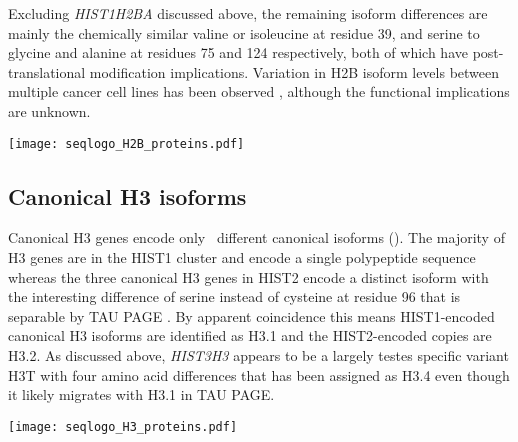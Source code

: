     Excluding \textit{HIST1H2BA} discussed above,
    the remaining isoform differences are mainly the chemically
    similar valine or isoleucine at residue 39,
    and serine to glycine and alanine at residues 75 and 124 respectively,
    both of which have post-translational modification implications.
    Variation in H2B isoform levels between multiple cancer cell
    lines has been observed \citep{Molden2015},
    although the functional implications are unknown.

    \begin{table}
      \caption{%
        Canonical H2B protein isoforms.  Upper panel shows isoforms
        relative to the most common protein sequence.  Lower panel
        shows sequence logo of all isoforms aligned with invariant
        residues in grey.
      }
      \label{tab:H2B-consensus}
      
      \texttt{[image: seqlogo\_H2B\_proteins.pdf]}
    \end{table}

  \subsection{Canonical H3 isoforms}
    Canonical H3 genes encode only \HThreeUniqueProteins{}~different
    canonical isoforms ().
    The majority of H3 genes are in the HIST1 cluster and encode a
    single polypeptide sequence \citep{Ederveen2011}
    whereas the three canonical H3 genes in HIST2 encode a distinct isoform
    with the interesting difference of serine instead of cysteine at residue 96
    that is separable by TAU PAGE \citep{FranklinZweidler1977}.
    By apparent coincidence this means HIST1-encoded canonical H3 isoforms are
    identified as H3.1 and the HIST2-encoded copies are H3.2.
    As discussed above, \textit{HIST3H3} appears to be
    a largely testes specific variant H3T
    with four amino acid differences that has been assigned as H3.4 \citep{Talbert2012}
    even though it likely migrates with H3.1 in TAU PAGE.

    \begin{table}
      \caption{%
        Canonical H3 protein isoforms.  Upper panel shows isoforms
        relative to the most common protein sequence.  Lower panel
        shows sequence logo of all isoforms aligned with invariant
        residues in grey.
      }
      \label{tab:H3-consensus}
      
      \texttt{[image: seqlogo\_H3\_proteins.pdf]}
    \end{table}

